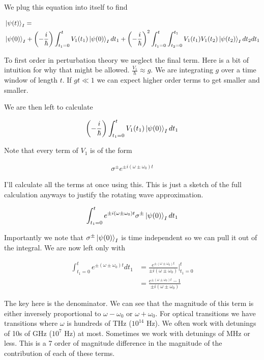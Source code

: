 \documentclass[12pt]{article}
\begin{document}
We plug this equation into itself to find

\begin{align}
&\ket{\psi(t)}_I =\\
&\ket{\psi(0)}_I + \left(-\frac{i}{\hbar}\right)\int_{t_1=0}^t V_1(t_1)\ket{\psi(0)}_I dt_1 + \left(-\frac{i}{\hbar} \right)^2 \int_{t_1=0}^t \int_{t_2=0}^{t_1}V_1(t_1)V_1(t_2)\ket{\psi(t_2)}_I dt_2dt_1
\end{align}

To first order in perturbation theory we neglect the final term. Here is a bit of intuition for why that might be allowed. $\frac{V_1}{\hbar} \approx g$. We are integrating $g$ over a time window of length $t$. If $gt \ll 1$ we can expect higher order terms to get smaller and smaller.

We are then left to calculate

\begin{align}
\left(-\frac{i}{\hbar}\right)\int_{t_1=0}^t V_1(t_1)\ket{\psi(0)}_I dt_1
\end{align}

Note that every term of $V_1$ is of the form

\begin{align}
\sigma^{\pm}e^{\pm i(\omega \pm \omega_0)t}
\end{align}

I'll calculate all the terms at once using this. This is just a sketch of the full calculation anyways to justify the rotating wave approximation.

\begin{align}
\int_{t_1=0}^t e^{\pm i(\omega \pm \omega_0)t} \sigma^{\pm} \ket{\psi(0)}_I dt_1
\end{align}

Importantly we note that $\sigma^{\pm}\ket{\psi(0)}_I$ is time independent so we can pull it out of the integral. We are now left only with

\begin{align}
\int_{t_1=0}^t e^{\pm(\omega \pm \omega_0)t} dt_1 &= \frac{e^{\pm(\omega \pm \omega_0)t}}{\pm i (\omega \pm \omega_0)} \Biggr \rvert_{t_1=0}^t\\
&= \frac{e^{\pm (\omega \pm \omega_0) t} - 1}{\pm i(\omega \pm \omega_0)}
\end{align}

The key here is the denominator. We can see that the magnitude of this term is either inversely proportional to $\omega - \omega_0$ or $\omega+\omega_0$. For optical transitions we have transitions where $\omega$ is hundreds of THz ($10^{14}$ Hz). We often work with detunings of 10s of GHz ($10^7$ Hz) at most. Sometimes we work with detunings of MHz or less. This is a 7 order of magnitude difference in the magnitude of the contribution of each of these terms.
\end{document}
